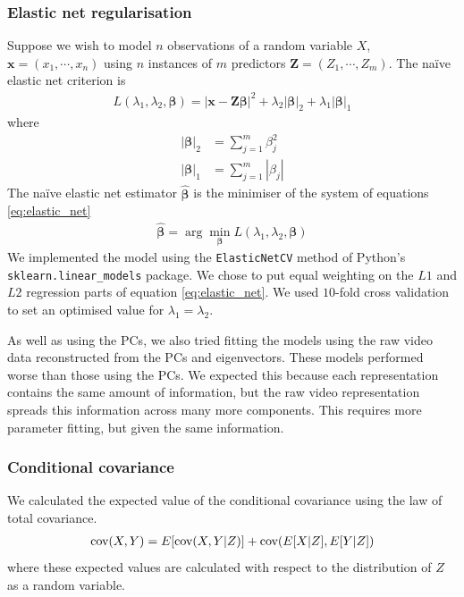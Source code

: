         \subsubsection{Elastic net regularisation}
        Suppose we wish to model $n$ observations of a random variable $X$, $\mathbf{x} = (x_1, \cdots, x_n)$ using $n$ instances of $m$ predictors $\mathbf{Z} = (Z_1, \cdots, Z_m)$. The na\"{i}ve elastic net criterion is
        \begin{align}\label{eq:elastic_net}
            L(\lambda_1, \lambda_2, \boldsymbol{\beta}) = | \mathbf{x} - \mathbf{Z} \boldsymbol{\beta} |^2 + \lambda_2 |\boldsymbol{\beta}|_2 + \lambda_1 |\boldsymbol{\beta}|_1
        \end{align}
        where
        \begin{align}
          |\boldsymbol{\beta}|_2 &= \sum_{j=1}^m \beta_j^2 \\
          |\boldsymbol{\beta}|_1 &= \sum_{j=1}^m |\beta_j|
        \end{align}
        The na\"{i}ve elastic net estimator $\hat{\boldsymbol{\beta}}$ is the minimiser of the system of equations \ref{eq:elastic_net}  \parencite{zou}
        \begin{align}
          \hat{\boldsymbol{\beta}} = \arg \min_{\boldsymbol{\beta}} L(\lambda_1, \lambda_2, \boldsymbol{\beta})
        \end{align}
        We implemented the model using the \texttt{ElasticNetCV} method of Python's \\ \texttt{sklearn.linear\_models} package. We chose to put equal weighting on the $L1$ and $L2$ regression parts of equation \ref{eq:elastic_net}. We used $10$-fold cross validation to set an  optimised value for $\lambda_1 = \lambda_2$.

        As well as using the PCs, we also tried fitting the models using the raw video data reconstructed from the PCs and eigenvectors. These models performed worse than those using the PCs. We expected this because each representation contains the same amount of information, but the raw video representation spreads this information across many more components. This requires more parameter fitting, but given the same information.

        \subsubsection{Conditional covariance}\label{sec:conditional_covariance}
        We calculated the expected value of the conditional covariance using the law of total covariance.
        \begin{align}\label{eq:law_of_total_covariance}
            \text{cov} (X,Y) = E[ \text{cov}(X,Y|Z)] + \text{cov}(E[X|Z], E[Y|Z])
        \end{align}
        where these expected values are calculated with respect to the distribution of $Z$ as a random variable.

